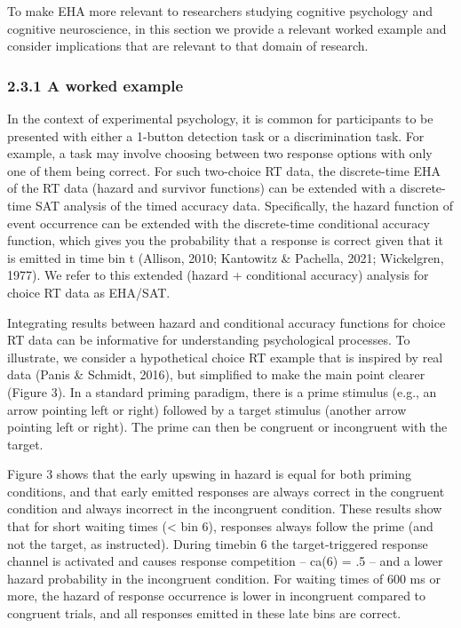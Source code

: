 \documentclass[
  man, donotrepeattitle,floatsintext]{apa6}
\begin{document}
To make EHA more relevant to researchers studying cognitive psychology and cognitive neuroscience, in this section we provide a relevant worked example and consider implications that are relevant to that domain of research.

\subsubsection{2.3.1 A worked example}\label{a-worked-example}

In the context of experimental psychology, it is common for participants to be presented with either a 1-button detection task or a discrimination task. For example, a task may involve choosing between two response options with only one of them being correct. For such two-choice RT data, the discrete-time EHA of the RT data (hazard and survivor functions) can be extended with a discrete-time SAT analysis of the timed accuracy data. Specifically, the hazard function of event occurrence can be extended with the discrete-time conditional accuracy function, which gives you the probability that a response is correct given that it is emitted in time bin t (Allison, 2010; Kantowitz \& Pachella, 2021; Wickelgren, 1977). We refer to this extended (hazard + conditional accuracy) analysis for choice RT data as EHA/SAT.

Integrating results between hazard and conditional accuracy functions for choice RT data can be informative for understanding psychological processes. To illustrate, we consider a hypothetical choice RT example that is inspired by real data (Panis \& Schmidt, 2016), but simplified to make the main point clearer (Figure 3). In a standard priming paradigm, there is a prime stimulus (e.g., an arrow pointing left or right) followed by a target stimulus (another arrow pointing left or right). The prime can then be congruent or incongruent with the target.

Figure 3 shows that the early upswing in hazard is equal for both priming conditions, and that early emitted responses are always correct in the congruent condition and always incorrect in the incongruent condition. These results show that for short waiting times (\textless{} bin 6), responses always follow the prime (and not the target, as instructed). During timebin 6 the target-triggered response channel is activated and causes response competition -- ca(6) = .5 -- and a lower hazard probability in the incongruent condition. For waiting times of 600 ms or more, the hazard of response occurrence is lower in incongruent compared to congruent trials, and all responses emitted in these late bins are correct.
\end{document}
